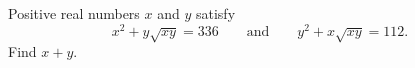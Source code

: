 Positive real numbers $x$ and $y$ satisfy
\[
x^2+y\sqrt{xy}=336\qquad\text{and}\qquad y^2+x\sqrt{xy}=112 .
\]
Find $x+y$.
